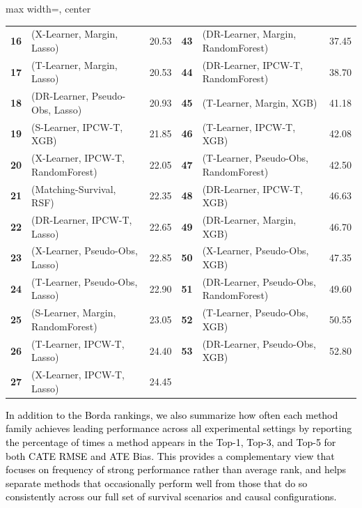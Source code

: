 \documentclass{article} %
\newcommand{\rebuttal}[1]{\textcolor{black}{#1}}
\begin{document}
\begin{table}[ht]
\begin{adjustbox}{max width=\textwidth, center}
\begin{tabular}{rlr@{\hskip 24pt}rlr}
\textbf{16} & (X-Learner, Margin, Lasso) & 20.53 & \textbf{43} & (DR-Learner, Margin, RandomForest) & 37.45 \\
\textbf{17} & (T-Learner, Margin, Lasso) & 20.53 & \textbf{44} & (DR-Learner, IPCW-T, RandomForest) & 38.70 \\
\textbf{18} & (DR-Learner, Pseudo-Obs, Lasso) & 20.93 & \textbf{45} & (T-Learner, Margin, XGB) & 41.18 \\
\textbf{19} & (S-Learner, IPCW-T, XGB) & 21.85 & \textbf{46} & (T-Learner, IPCW-T, XGB) & 42.08 \\
\textbf{20} & (X-Learner, IPCW-T, RandomForest) & 22.05 & \textbf{47} & (T-Learner, Pseudo-Obs, RandomForest) & 42.50 \\
\textbf{21} & (Matching-Survival, RSF) & 22.35 & \textbf{48} & (DR-Learner, IPCW-T, XGB) & 46.63 \\
\textbf{22} & (DR-Learner, IPCW-T, Lasso) & 22.65 & \textbf{49} & (DR-Learner, Margin, XGB) & 46.70 \\
\textbf{23} & (X-Learner, Pseudo-Obs, Lasso) & 22.85 & \textbf{50} & (X-Learner, Pseudo-Obs, XGB) & 47.35 \\
\textbf{24} & (T-Learner, Pseudo-Obs, Lasso) & 22.90 & \textbf{51} & (DR-Learner, Pseudo-Obs, RandomForest) & 49.60 \\
\textbf{25} & (S-Learner, Margin, RandomForest) & 23.05 & \textbf{52} & (T-Learner, Pseudo-Obs, XGB) & 50.55 \\
\textbf{26} & (T-Learner, IPCW-T, Lasso) & 24.40 & \textbf{53} & (DR-Learner, Pseudo-Obs, XGB) & 52.80 \\
\textbf{27} & (X-Learner, IPCW-T, Lasso) & 24.45 &  &  &  \\
\bottomrule
\end{tabular}
\end{adjustbox}
\end{table}

\rebuttal{
In addition to the Borda rankings, we also summarize how often each method family achieves leading performance across all experimental settings by reporting the percentage of times a method appears in the \textcolor{black}{Top-1, Top-3, and Top-5 for both CATE RMSE and ATE Bias}. This provides a complementary view that focuses on frequency of strong performance rather than average rank, and helps separate methods that occasionally perform well from those that do so consistently across our full set of survival scenarios and causal configurations.}
\end{document}
